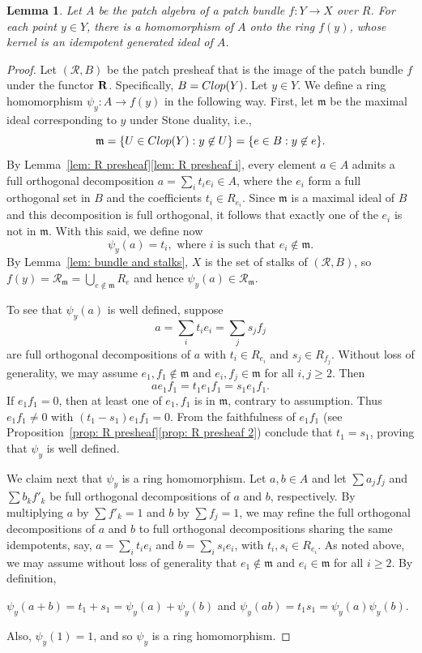 \documentclass[11pt]{amsart}
\def\m{{\mathfrak m}} %
\newtheorem{lemma}[theorem]{Lemma}
\theoremstyle{definition}
\def\cal{\mathcal}
\begin{document}
\begin{lemma} \label{lem: basic patch}
Let $A$ be the patch algebra of a patch bundle $f:Y \rightarrow X$ over $R$. For each point $y \in Y$, there is a homomorphism of $A$ onto the ring $f(y)$, whose kernel is an idempotent generated ideal of $A$.   
\end{lemma}
\begin{proof}
Let $({\cal R},B)$ be the patch presheaf that is the image of the patch bundle $f$ under the functor ${\bf R}$. Specifically, $B = {\rm Clop}(Y)$. Let ${y} \in Y$. 
We define a ring homomorphism $\psi_{y}:A \rightarrow f(y)$  in the following way. First, let $\m$ be the maximal ideal corresponding to $y$ under Stone duality, i.e., $$\m = \{U \in {\rm Clop}(Y):y \not\in U\}=\{e\in B : y\not \in e\}.$$ By Lemma~\ref{lem: R presheaf}\ref{lem: R presheaf i}, every element $a\in A$ admits a full orthogonal decomposition $a=\sum_i t_ie_i \in A$, where the $e_i$ form a full orthogonal set in $B$ and the coefficients $t_i \in R_{e_i}$. Since $\m$ is a maximal ideal of $B$ and this decomposition is full orthogonal, it follows that exactly one of the $e_i$ is not in $\m$. 
With this said, we define now 
\[\psi_{y}(a) = t_i,\text{ where }i\text{ is such that }e_i \not \in \m.\] By Lemma~\ref{lem: bundle and stalks}, $X$ is the set of stalks of $({\cal R},B)$, so 
$ f (y)={\mathcal{R}}_\m=\bigcup_{e\not \in \m} R_e$ and hence  $\psi_{y}(a) \in {\mathcal{R}}_{\m}$. 

To see that $\psi_y(a)$ is well defined, suppose $$a = \sum_i t_i e_i = \sum_j s_j f_j$$ are full orthogonal decompositions of $a$ with $t_i \in R_{e_i}$ and $s_j \in R_{f_j}$.  Without loss of generality, we may assume $e_1,f_1 \not \in \m$ and $e_i,f_j \in \m$ for all $i,j \geq 2$.   Then $$ae_1f_1 =t_1e_1f_1=s_1e_1f_1.$$  
If $e_1f_1 =0$, then at least one of $e_1,f_1$ is in $\m$, contrary to assumption. Thus $e_1f_1 \ne 0$ with $(t_1 -s_1)e_1f_1=0$. From the faithfulness of $e_1f_1$ (see Proposition~\ref{prop: R presheaf}\ref{prop: R presheaf 2}) conclude that $t_1 = s_1$, proving that $\psi_y$ is well defined. 

We claim next that $\psi_{y}$ is a ring homomorphism. 
Let $a,b \in A$ and let $\sum a_j f_j$ and $\sum b_k f'_k$ be full orthogonal decompositions of $a$ and $b$, respectively. By multiplying $a$ by $\sum f'_k=1$ and $b$ by $\sum f_j=1$, we may refine the full orthogonal decompositions of $a$ and $b$ to full orthogonal decompositions sharing the same idempotents, say,  $a =\sum_i t_i e_i$ and $b = \sum_i s_ie_i$, with $t_i,s_i \in R_{e_i}$. As noted above, we may assume without loss of generality that $e_1\not \in \m$ and $e_i \in \m$ for all $i \geq 2$.  By definition, \begin{center} $\psi_y(a+b) = t_1+s_1 = \psi_y(a)+\psi_y(b)$ and $\psi_y(ab) = t_1s_1 = \psi_y(a)\psi_y(b)$.
\end{center}
Also, $\psi_y(1) =1$,  and so $\psi_y$ is a ring homomorphism.




\end{proof}
\end{document}
